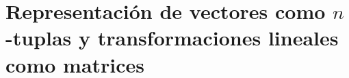 \documentclass[notasLineal]{subfiles}
\begin{document}
\section{Representación de vectores como $n$-tuplas y transformaciones lineales como matrices}\label{Sec: Representación de vectores como n-tuplas y transformaciones lineales como matrices}
\end{document}
